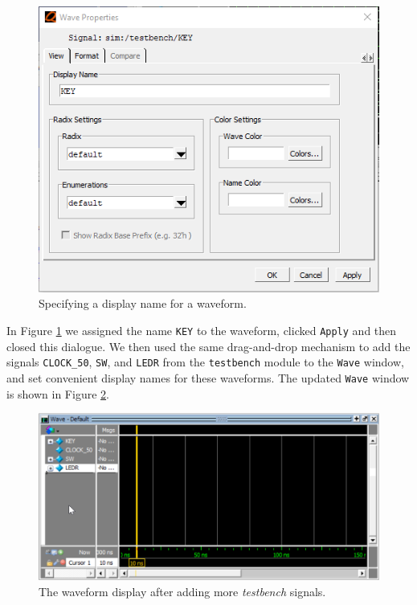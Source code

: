 \documentclass[11pt, twoside, pdftex]{article}
\begin{document}
\begin{figure}[h!]
	\begin{center}
		\includegraphics[scale=0.8]{figures/appa_fig3.png}
	\end{center}
		  \caption{Specifying a display name for a waveform.}
	\label{fig:appa_fig3}
\end{figure}

\noindent
In Figure \ref{fig:appa_fig3} we assigned the name \texttt{KEY} to the waveform, clicked
\texttt{Apply} and then closed this dialogue. We then used the same drag-and-drop mechanism
to add the signals \texttt{CLOCK\_50}, \texttt{SW}, and \texttt{LEDR} from the
\texttt{testbench} module to the \texttt{Wave} window, and set convenient display names 
for these waveforms. The updated \texttt{Wave} window is shown in Figure \ref{fig:appa_fig4}.

\begin{figure}[hb!]
	\begin{center}
		\includegraphics[width = \textwidth]{figures/appa_fig4.png}
	\end{center}
	\caption{The waveform display after adding more {\it testbench} signals.}
	\label{fig:appa_fig4}
\end{figure}
\end{document}

